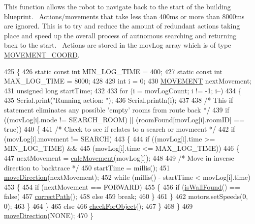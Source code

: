 This function allows the robot to navigate back to the start of the building blueprint.~\newline
Actions/movements that take less than 400ms or more than 8000ms are ignored. This is to try and reduce the amount of redundant actions taking place and speed up the overall process of autnomous searching and returning back to the start.~\newline
Actions are stored in the mov\+Log array which is of type \hyperlink{structMOVEMENT__COORD}{M\+O\+V\+E\+M\+E\+N\+T\+\_\+\+C\+O\+O\+R\+D}. 
\begin{DoxyCode}
425 \{
426   \textcolor{keyword}{static} \textcolor{keyword}{const} \textcolor{keywordtype}{int} MIN\_LOG\_TIME = 400;
427   \textcolor{keyword}{static} \textcolor{keyword}{const} \textcolor{keywordtype}{int} MAX\_LOG\_TIME = 8000;
428 
429   \textcolor{keywordtype}{int} i = 0;
430   \hyperlink{robotcode_8ino_adc716dd21485bffb9015eaeb3cfe6859}{MOVEMENT} nextMovement;
431   \textcolor{keywordtype}{unsigned} \textcolor{keywordtype}{long} startTime;
432 
433   \textcolor{keywordflow}{for} (i = movLogCount; i != -1; i--)
434   \{
435     Serial.print(\textcolor{stringliteral}{"Running action: "});
436     Serial.println(i);
437 
438     \textcolor{comment}{/* This if statement eliminates any possible 'empty' rooms from route back */}
439     \textcolor{keywordflow}{if} ((movLog[i].mode != SEARCH\_ROOM) || (roomFound[movLog[i].roomID] == \textcolor{keyword}{true}))
440     \{
441       \textcolor{comment}{/* Check to see if relates to a search or movmeent */}
442       \textcolor{keywordflow}{if} (movLog[i].movement != SEARCH)
443       \{
444         \textcolor{keywordflow}{if} ((movLog[i].time >= MIN\_LOG\_TIME) &&
445             (movLog[i].time <= MAX\_LOG\_TIME))
446         \{
447           nextMovement = \hyperlink{robotcode_8ino_afe70bedfede401b2e61d7e2a54120bea}{calcMovement}(movLog[i]);
448 
449           \textcolor{comment}{/* Move in inverse direction to backtrace */}
450           startTime = millis();
451           \hyperlink{robotcode_8ino_af776ff77e94170ec456760c6962020e5}{moveDirection}(nextMovement);
452           \textcolor{keywordflow}{while} (millis() - startTime < movLog[i].time)
453           \{
454             \textcolor{keywordflow}{if} (nextMovement == FORWARD)
455             \{
456               \textcolor{keywordflow}{if} (\hyperlink{robotcode_8ino_a2d3a70671b195d39ddeb7a437b85d957}{isWallFound}() == \textcolor{keyword}{false})
457                 \hyperlink{robotcode_8ino_abd77e61b6e1d72ce91e71cdbd86e3724}{correctPath}();
458               \textcolor{keywordflow}{else}
459                 \textcolor{keywordflow}{break};
460             \}
461           \}
462           motors.setSpeeds(0, 0);
463         \}
464       \}
465       \textcolor{keywordflow}{else}
466         \hyperlink{robotcode_8ino_ad8fb70ddbf7925148a848bd3c1df2b94}{checkForObject}();
467     \}
468   \}
469   \hyperlink{robotcode_8ino_af776ff77e94170ec456760c6962020e5}{moveDirection}(NONE);
470 \}
\end{DoxyCode}

